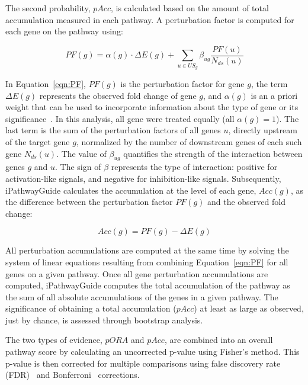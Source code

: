 The second probability, $pAcc$, is calculated based on the amount of total accumulation measured in each pathway. A perturbation factor is computed for each gene on the pathway using:

\begin{equation}
\label{eqn:PF}
PF(g) = \alpha(g) \cdot \Delta E(g) + \sum_{u \in US_g} \beta_{ug}\frac{PF(u)}{N_{ds}(u)}
\end{equation}


In Equation~\ref{eqn:PF}, $PF(g)$ is the perturbation factor for gene $g$, the term $\Delta E(g)$ represents the observed fold change of gene $g$, and $\alpha(g)$ is an a priori weight that can be used to incorporate information about the type of gene or its significance~\cite{voichita2012incorporating}. In this analysis, all gene were treated equally (all $\alpha(g)=1$). The last term is the sum of the perturbation factors of all genes $u$, directly upstream of the target gene $g$, normalized by the number of downstream genes of each such gene $N_{ds}(u)$. The value of $\beta_{ug}$ quantifies the strength of the interaction between genes $g$ and $u$. The sign of $\beta$ represents the type of interaction: positive for activation-like signals, and negative for inhibition-like signals. Subsequently, iPathwayGuide calculates the accumulation at the level of each gene, $Acc(g)$, as the difference between the perturbation factor $PF(g)$ and the observed fold change:

\begin{equation}
Acc(g) = PF(g) - \Delta E(g)
\label{eqn:acc}
\end{equation}

All perturbation accumulations are computed at the same time by solving the system of linear equations resulting from combining Equation~\ref{eqn:PF} for all genes on a given pathway. Once all gene perturbation accumulations are computed, iPathwayGuide computes the total accumulation of the pathway as the sum of all absolute accumulations of the genes in a given pathway. The significance of obtaining a total accumulation ($pAcc$) at least as large as observed, just by chance, is assessed through bootstrap analysis.

The two types of evidence, $pORA$ and $pAcc$, are combined into an overall pathway score by calculating an uncorrected p-value using Fisher's method. This p-value is then corrected for multiple comparisons using false discovery rate (FDR)~\cite{Benjamini:1995,  Benjamini:2001} and Bonferroni~\cite{Bonferroni:1935} corrections. 



